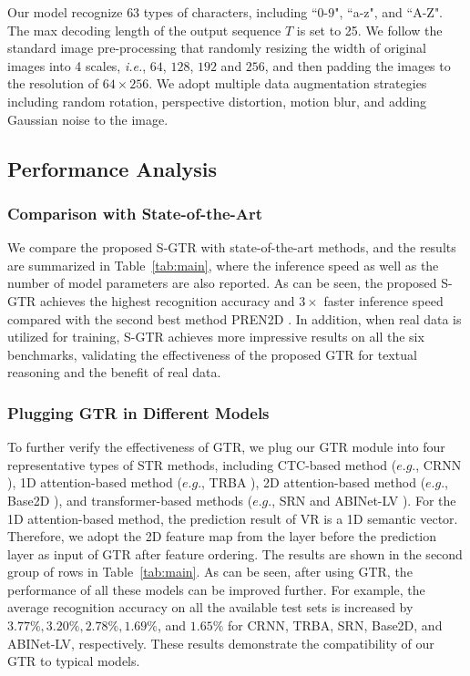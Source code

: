 \documentclass[letterpaper]{article} \usepackage{aaai22}  \usepackage{times}  \usepackage{helvet}  \usepackage{courier}  \usepackage[hyphens]{url}  \usepackage{graphicx} \urlstyle{rm} \def\UrlFont{\rm}  \usepackage{natbib}  \usepackage{caption} \DeclareCaptionStyle{ruled}{labelfont=normalfont,labelsep=colon,strut=off} \frenchspacing  \setlength{\pdfpagewidth}{8.5in}  \setlength{\pdfpageheight}{11in}
\newcommand{\bt}{\color{black}}
\begin{document}
Our model recognize $63$ types of characters, including ``$0$-$9$", ``a-z", and ``A-Z". The max decoding length of the output sequence $T$ is set to 25. We follow the standard image pre-processing that randomly resizing the width of original images into 4 scales, \textit{i.e.}, $64$, $128$, $192$ and $256$, and then padding the images to the resolution of $64 \times 256$. We adopt multiple data augmentation strategies including random rotation, perspective distortion, motion blur, and adding Gaussian noise to the image. 






\subsection{Performance Analysis}
\label{subsec:performanceAnalysis}
\subsubsection{Comparison with State-of-the-Art}

We compare the proposed S-GTR with state-of-the-art methods, and the results are summarized in Table~\ref{tab:main}, where the inference speed as well as the number of model parameters are also reported. As can be seen, the proposed S-GTR achieves the highest recognition accuracy and $3\times$ faster inference speed compared with the second best method PREN2D \cite{yan2021primitive}. In addition, when real data is utilized for training, S-GTR achieves more impressive results on all the six benchmarks, validating the effectiveness of the proposed GTR for textual reasoning and the benefit of real data.



\subsubsection{Plugging GTR in Different Models}


To further verify the effectiveness of GTR, we plug our GTR module into four representative types of STR methods, including CTC-based method ($e.g.$, CRNN \cite{shi2016end}), 1D attention-based method ($e.g.$, TRBA \cite{baek2019wrong}), 2D attention-based method ($e.g.$, Base2D \cite{yan2021primitive}), and transformer-based methods ($e.g.$, SRN \cite{yu2020towards} and {\bt ABINet-LV} \cite{fang2021read}). For the 1D attention-based method, the prediction result of VR is a 1D semantic vector. Therefore, we adopt the 2D feature map from the layer before the prediction layer as input of GTR after feature ordering. The results are shown in the second group of rows in Table~\ref{tab:main}. As can be seen, after using GTR, the performance of all these models can be improved further. For example, the average recognition accuracy on all the available test sets is increased by $3.77\%,3.20\%,2.78\%,1.69\%$, and {\bt $1.65\%$} for CRNN, TRBA, SRN, Base2D, and {\bt ABINet-LV}, respectively. These results demonstrate the compatibility of our GTR to typical models.
\end{document}
